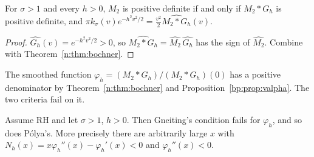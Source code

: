 \begin{lemma}[proved]\label{n:lem:gauss}
For $\sigma>1$ and every $h>0$, $M_2$ is positive definite if and only if $M_2*G_h$ is positive definite, and $\pi k_\sigma(v)e^{-h^2v^2/2}=\frac{v^2}2\widehat{M_2*G_h}(v)$.
\end{lemma}

\begin{proof}
$\widehat{G_h}(v)=e^{-h^2v^2/2}>0$, so $\widehat{M_2*G_h}=\widehat{M_2}\,\widehat{G_h}$ has the sign of $\widehat{M_2}$. Combine with Theorem~\ref{n:thm:bochner}.
\end{proof}

The smoothed function $\varphi_h=(M_2*G_h)/(M_2*G_h)(0)$ has a positive denominator by Theorem~\ref{n:thm:bochner} and Proposition~\ref{bp:prop:valpha}. The two criteria fail on it.

\begin{theorem}[conditional (RH)]\label{n:thm:obstruct}
Assume RH and let $\sigma>1$, $h>0$. Then Gneiting's condition fails for $\varphi_h$, and so does Pólya's. More precisely there are arbitrarily large $x$ with $N_h(x)=x\varphi_h''(x)-\varphi_h'(x)<0$ and $\varphi_h''(x)<0$.
\end{theorem}

